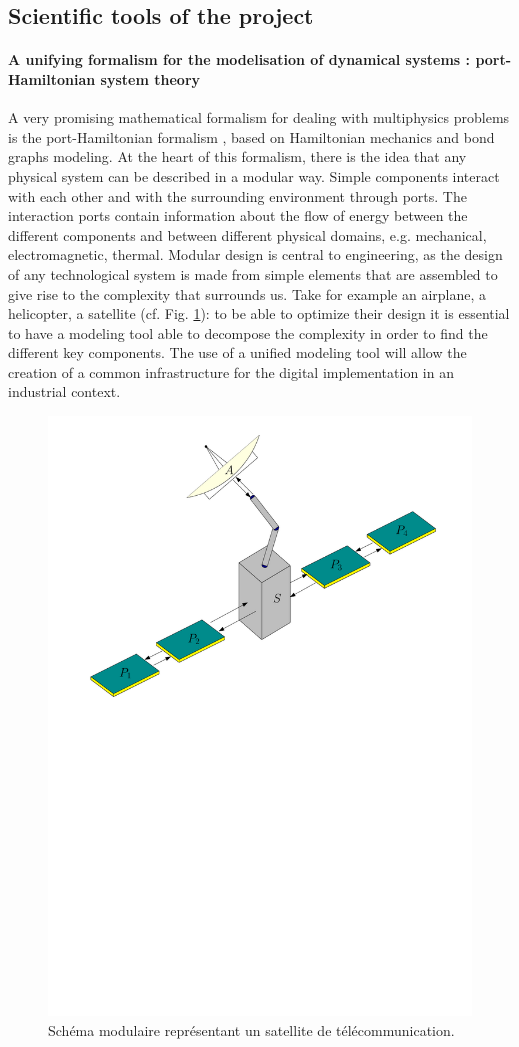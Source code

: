\documentclass[12pt]{article}
\begin{document}
	
	\subsection{Scientific tools of the project}
	
	\paragraph{A unifying formalism for the modelisation of dynamical systems : port-Hamiltonian system theory\\}

	
	A very promising mathematical formalism for dealing with multiphysics problems is the port-Hamiltonian formalism \cite{vanderSchaft2002}, based on Hamiltonian mechanics and bond graphs modeling. At the heart of this formalism, there is the idea that any physical system can be described in a modular way. Simple components interact with each other and with the surrounding environment through ports. The interaction ports contain information about the flow of energy between the different components and between different physical domains, e.g. mechanical, electromagnetic, thermal. Modular design is central to engineering, as the design of any technological system is made from simple elements that are assembled to give rise to the complexity that surrounds us. Take for example an airplane, a helicopter, a satellite (cf. Fig. \ref{fig:satellite}): to be able to optimize their design it is essential to have a modeling tool able to decompose the complexity in order to find the different key components. The use of a unified modeling tool will allow the creation of a common infrastructure for the digital implementation in an industrial context.



	\begin{figure}[hb]
		\centering
		\includegraphics[width=.55\textwidth]{satellite.pdf}
		\caption{Schéma modulaire représentant un satellite de télécommunication.}
		\label{fig:satellite}
	\end{figure}
	
\end{document}
